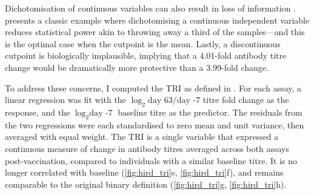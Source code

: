 Dichotomisation of continuous variables can also result in loss of information \autocite{cohen1983CostDichotomization,senn2005DichotomaniaObsessiveCompulsive,altman2006CostDichotomisingContinuous,fedorov2009ConsequencesDichotomization}.
\textcite{cohen1983CostDichotomization} presents a classic example where 
dichotomising a continuous independent variable reduces statistical power akin to throwing away a third of the samples---and this is the optimal case when the cutpoint is the mean.
Lastly, a discontinuous cutpoint is biologically implausible, implying that a 4.01-fold antibody titre change would be dramatically more protective than a 3.99-fold change.

%
To address these concerns, I computed the \gls{TRI} as defined in \textcite{bucasas2011EarlyPatternsGene}.
For each assay, a linear regression was fit with the $\log_2{\text{day 63}/\text{day -7}}$ titre fold change as the response, and the $\log_2{\text{day -7}}$ baseline titre as the predictor.
The residuals from the two regressions were each standardised to zero mean and unit variance, then averaged with equal weight.
The \gls{TRI} is a single variable that expressed a continuous measure of change in antibody titres averaged across both assays post-vaccination, 
compared to individuals with a similar baseline titre. 
It is no longer correlated with baseline (\cref{fig:hird_tri}e, \cref{fig:hird_tri}f),
and remains comparable to the original binary definition (\cref{fig:hird_tri}g, \cref{fig:hird_tri}h).

